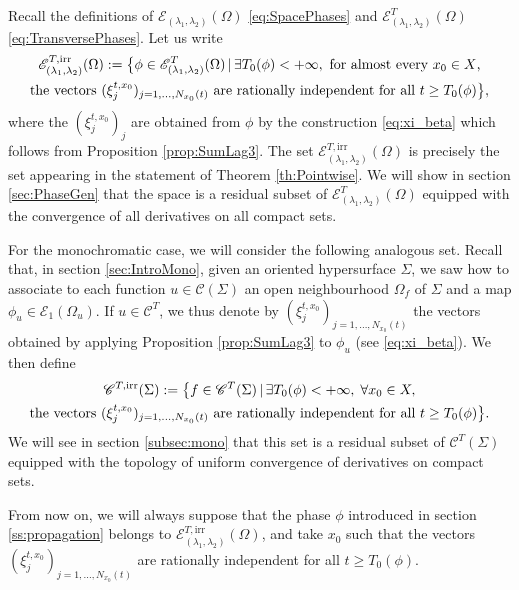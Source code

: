 \documentclass[10pt]{amsart}
\let\mathcal\mathscr
\newcommand{\irr}{\mathrm{irr}}
\theoremstyle{plain}
\theoremstyle{definition}
\begin{document}
Recall the definitions of $\mathcal{E}_{(\lambda_1,\lambda_2)}(\Omega)$ \eqref{eq:SpacePhases} and $\mathcal{E}^{T}_{(\lambda_1,\lambda_2)}(\Omega)$ \eqref{eq:TransversePhases}. Let us write\vspace*{-8pt}
\begin{multline}\label{eq:DefIrr}
\mathcal{E}^{T, \irr}_{(\lambda_1,\lambda_2)}(\Omega):=\big{\{} \phi \in \mathcal{E}^T_{(\lambda_1,\lambda_2)}(\Omega)\, |\, \exists T_0(\phi)<+\infty, \text{ for almost every $x_0\in X$,}\\
\text{the vectors $(\xi_j^{t,x_0})_{j=1,\dots,N_{x_0}(t)}$ are rationally independent for all $t\geq T_0(\phi)$}\big{\}},
\end{multline}
where the $(\xi_j^{t,x_0})_j$ are obtained from $\phi$ by the construction \eqref{eq:xi_beta} which follows from Proposition \ref{prop:SumLag3}. The set $\mathcal{E}^{T, \irr}_{(\lambda_1,\lambda_2)}(\Omega)$ is precisely the set appearing in the statement of Theorem \ref{th:Pointwise}. We will show in section \ref{sec:PhaseGen} that the space is a residual subset of $\mathcal{E}^{T}_{(\lambda_1,\lambda_2)}(\Omega)$ equipped with the convergence of all derivatives on all compact sets.

For the monochromatic case, we will consider the following analogous set. Recall that, in section \ref{sec:IntroMono}, given an oriented hypersurface $\Sigma$, we saw how to associate to each function $u\in \mathcal{C}(\Sigma)$ an open neighbourhood $\Omega_f$ of $\Sigma$ and a map $\phi_u \in \mathcal{E}_1(\Omega_u)$. If $u\in \mathcal{C}^T$, we thus denote by $(\xi_j^{t,x_0})_{j=1,\dots,N_{x_0}(t)}$ the vectors obtained by applying Proposition \ref{prop:SumLag3} to $\phi_u$ (see \eqref{eq:xi_beta}).
We then define
\begin{multline}\label{eq:DefGeneMono}
\mathcal{C}^{T,\irr}(\Sigma) := \big{\{} f\in \mathcal{C}^T(\Sigma) \, |\, \exists T_0(\phi)<+\infty,\; \forall x_0\in X,\\ \text{the vectors $(\xi_j^{t,x_0})_{j=1,\dots,N_{x_0}(t)}$ are rationally independent for all $t\geq T_0(\phi)$}\big{\}}.
\end{multline}
We will see in section \ref{subsec:mono} that this set is a residual subset of $\mathcal{C}^{T}(\Sigma) $ equipped with the topology of uniform convergence of derivatives on compact sets.

From now on, we will always suppose that the phase $\phi$ introduced in section \ref{ss:propagation} \hbox{belongs} to $\mathcal{E}^{T,\irr}_{(\lambda_1,\lambda_2)}(\Omega)$, and take $x_0$ such that the vectors $(\xi_j^{t,x_0})_{j=1,\dots,N_{x_0}(t)}$ are rationally independent for all $t\geq T_0(\phi)$.
\end{document}
